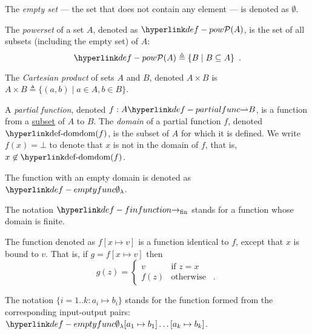 \begin{definition}
  The \emph{empty set} --- the set that does not contain any element --- is denoted as $\emptyset$.
\end{definition}

\hypertarget{def-pow}{}
\begin{definition}[Powerset]
  The \emph{powerset} of a set $A$, denoted as $\pow{A}$, is the set of all subsets (including the empty set) of $A$:
  \[
     \pow{A} \triangleq \{ B \;|\; B \subseteq A\} \enspace.
  \]
\end{definition}

\begin{definition}
    The \emph{Cartesian product} of sets $A$ and $B$, denoted $A \times B$
    is $A \times B \triangleq \{(a,b) \;|\; a \in A, b \in B\}$.
\end{definition}

\hypertarget{def-partialfunc}{}
\hypertarget{def-dom}{}
\begin{definition}
  A \emph{partial function}, denoted $f : A \partialto B$, is a function from a \underline{subset} of $A$ to $B$.
  The \emph{domain} of a partial function $f$, denoted $\dom(f)$, is the subset of $A$ for which it is defined.
  We write $f(x) = \bot$ to denote that $x$ is not in the domain of $f$, that is, $x \not\in \dom(f)$.
\end{definition}

\hypertarget{def-emptyfunc}{}
\begin{definition}
The function with an empty domain is denoted as $\emptyfunc$.
\end{definition}

\hypertarget{def-finfunction}{
The notation $\rightarrowfin$ stands for a function whose domain is finite.
}

\begin{definition}
  The function denoted as $f[x \mapsto v]$ is a function identical to $f$, except that $x$ is bound
  to $v$. That is, if  $g = f[x \mapsto v]$ then
  \[
    g(z) =
  \begin{cases}
    v     & \text{if } z = x\\
    f(z)  & \text{otherwise } \enspace.
  \end{cases}
  \]

  The notation $\{i=1..k: a_i\mapsto b_i\}$ stands for the function formed from the corresponding input-output pairs:
  $\emptyfunc[a_1\mapsto b_1]\ldots[a_k\mapsto b_k]$.
\end{definition}

